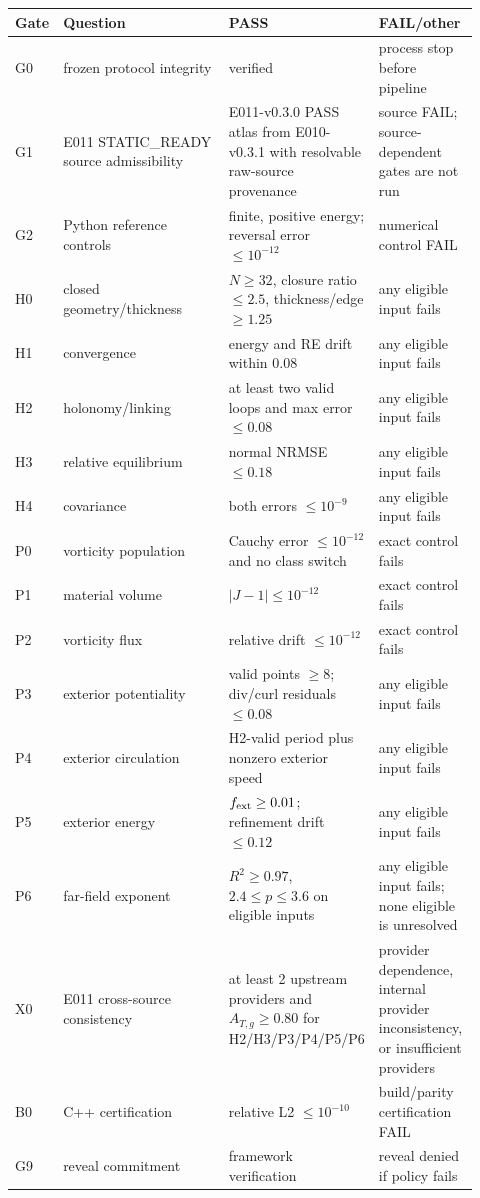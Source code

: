 \documentclass[11pt,a4paper]{article}
\begin{document}
\begin{longtable}{p{0.08\linewidth}p{0.42\linewidth}p{0.20\linewidth}p{0.22\linewidth}}
\toprule
Gate & Question & PASS & FAIL/other \\
\midrule
G0 & frozen protocol integrity & verified & process stop before pipeline \\
G1 & E011 STATIC\_READY source admissibility & E011-v0.3.0 PASS atlas from E010-v0.3.1 with resolvable raw-source provenance & source FAIL; source-dependent gates are not run \\
G2 & Python reference controls & finite, positive energy; reversal error $\le10^{-12}$ & numerical control FAIL \\
H0 & closed geometry/thickness & $N\ge32$, closure ratio $\le2.5$, thickness/edge $\ge1.25$ & any eligible input fails \\
H1 & convergence & energy and RE drift within 0.08 & any eligible input fails \\
H2 & holonomy/linking & at least two valid loops and max error $\le0.08$ & any eligible input fails \\
H3 & relative equilibrium & normal NRMSE $\le0.18$ & any eligible input fails \\
H4 & covariance & both errors $\le10^{-9}$ & any eligible input fails \\
P0 & vorticity population & Cauchy error $\le10^{-12}$ and no class switch & exact control fails \\
P1 & material volume & $|J-1|\le10^{-12}$ & exact control fails \\
P2 & vorticity flux & relative drift $\le10^{-12}$ & exact control fails \\
P3 & exterior potentiality & valid points $\ge8$; div/curl residuals $\le0.08$ & any eligible input fails \\
P4 & exterior circulation & H2-valid period plus nonzero exterior speed & any eligible input fails \\
P5 & exterior energy & $f_{\rm ext}\ge0.01$; refinement drift $\le0.12$ & any eligible input fails \\
P6 & far-field exponent & $R^2\ge0.97$, $2.4\le p\le3.6$ on eligible inputs & any eligible input fails; none eligible is unresolved \\
X0 & E011 cross-source consistency & at least 2 upstream providers and $A_{T,g}\ge0.80$ for H2/H3/P3/P4/P5/P6 & provider dependence, internal provider inconsistency, or insufficient providers \\
B0 & C++ certification & relative L2 $\le10^{-10}$ & build/parity certification FAIL \\
G9 & reveal commitment & framework verification & reveal denied if policy fails \\
\bottomrule
\end{longtable}
\end{document}
